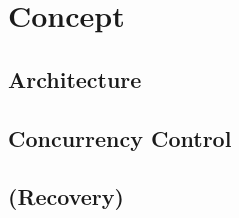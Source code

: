 \chapter{Concept}
\label{ch:concept}

\section{Architecture}
\section{Concurrency Control}
\section{(Recovery)}


